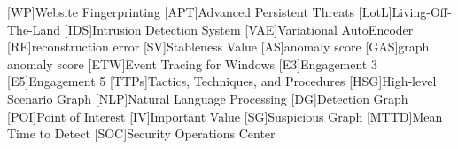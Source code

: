 

\newcommand{\ie}{i.e.,\xspace}
\newcommand{\eg}{e.g.,\xspace}
\newcommand{\etc}{etc.\xspace}
\newcommand{\etal}{\textit{et al.}\xspace}

\newcommand{\mypar}[1]{\vspace*{0.5ex}\textbf{#1}}
\newcommand{\mypari}[1]{\vspace*{0.5ex}\emph{#1}}
\newcommand{\company}{anonymous company\xspace}%

\newcommand{\cmark}{\ding{51}}%
\newcommand{\xmark}{\ding{55}}%
\newcommand{\blank}[1]{\textcolor{red}{(#1)}}
\newcommand{\explain}[1]{\textcolor{blue}{(#1)}}

\newcommand{\dingli}[1]{\textcolor{red}{(DL: #1)}}
\newcommand{\xiao}[1]{\textcolor{blue}{(XIAO: #1)}}
\newcommand{\shaofei}[1]{\textcolor{green}{(LI: #1)}}

\renewcommand{\algorithmicrequire}{\textbf{Input:}}  %
\renewcommand{\algorithmicensure}{\textbf{Output:}} %

\newcommand{\INPUT}{\item[\algorithmicinput]}
\newcommand{\OUTPUT}{\item[\algorithmicoutput]} 
\newcommand{\name}[1]{\textit{#1}}
\newcommand{\mname}[1]{\mathit{#1}}
\newcommand{\func}[1]{\texttt{#1}}
\newcommand{\toolname}{\textsc{NodLink}\xspace}
\newcommand{\toolnameu}{\textsc{Unicorn}\xspace}
\newcommand{\toolnameh}{\textsc{Holmes}\xspace}
\newcommand{\cadets}{\textsc{Cadets}\xspace}
\newcommand{\theia}{\textsc{Theia}\xspace}
\newcommand{\trace}{\textsc{Trace}\xspace}
\newcommand{\avedis}{two\xspace}
\newcommand{\insightone}{Attack Affinity\xspace}
\newcommand{\insighttwo}{Anomaly Polymerism\xspace}
\newcommand{\anosec}{AnonymousSec\xspace}
\newcommand{\activityanom}{Activity level Anomalies\xspace}
\newcommand{\eat}[1]{}
[WP]{Website Fingerprinting}
[APT]{Advanced Persistent Threats}
[LotL]{Living-Off-The-Land}
[IDS]{Intrusion Detection System}
[VAE]{Variational AutoEncoder}
[RE]{reconstruction error}
[SV]{Stableness Value}
[AS]{anomaly score}
[GAS]{graph anomaly score}
[ETW]{Event Tracing for Windows}
[E3]{Engagement 3}
[E5]{Engagement 5}
[TTPs]{Tactics, Techniques, and Procedures}
[HSG]{High-level Scenario Graph}
[NLP]{Natural Language Processing}
[DG]{Detection Graph}
[POI]{Point of Interest}
[IV]{Important Value}
[SG]{Suspicious Graph}
[MTTD]{Mean Time to Detect}
[SOC]{Security Operations Center}


